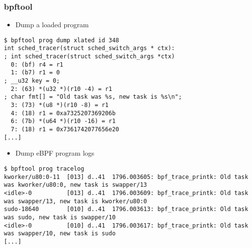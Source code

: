 \begin{frame}[fragile]
  \frametitle{bpftool}
  \begin{itemize}
    \item Dump a loaded program
  \end{itemize}
  \begin{block}{}
    \fontsize{8}{8}\selectfont
    \begin{verbatim}
$ bpftool prog dump xlated id 348
int sched_tracer(struct sched_switch_args * ctx):
; int sched_tracer(struct sched_switch_args *ctx)
  0: (bf) r4 = r1
  1: (b7) r1 = 0
; __u32 key = 0;
  2: (63) *(u32 *)(r10 -4) = r1
; char fmt[] = "Old task was %s, new task is %s\n";
  3: (73) *(u8 *)(r10 -8) = r1
  4: (18) r1 = 0xa7325207369206b
  6: (7b) *(u64 *)(r10 -16) = r1
  7: (18) r1 = 0x7361742077656e20
[...]
    \end{verbatim}
  \end{block}
  \begin{itemize}
    \item Dump eBPF program logs
  \end{itemize}
  \begin{block}{}
    \fontsize{6}{6}\selectfont
    \begin{verbatim}
$ bpftool prog tracelog
kworker/u80:0-11  [013] d..41  1796.003605: bpf_trace_printk: Old task was kworker/u80:0, new task is swapper/13
<idle>-0          [013] d..41  1796.003609: bpf_trace_printk: Old task was swapper/13, new task is kworker/u80:0
sudo-18640        [010] d..41  1796.003613: bpf_trace_printk: Old task was sudo, new task is swapper/10
<idle>-0          [010] d..41  1796.003617: bpf_trace_printk: Old task was swapper/10, new task is sudo
[...]
    \end{verbatim}
  \end{block}
\end{frame}

